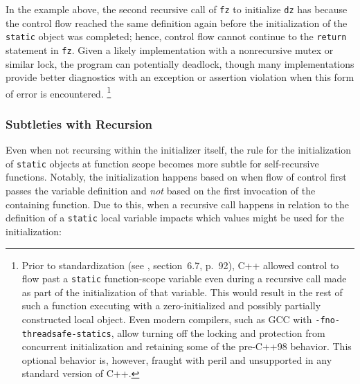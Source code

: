\noindent In the example above, the second recursive call of \lstinline!fz!
to initialize \lstinline!dz! has  because the control flow reached the
same definition again before the initialization of the
\lstinline!static! object was completed; hence, control flow cannot continue to the
\lstinline!return! statement in \lstinline!fz!. Given a likely implementation
with a nonrecursive mutex or similar lock, the program can potentially deadlock,
though many implementations provide better diagnostics with an exception or
assertion violation when this form of error is encountered.
{\cprotect\footnote{Prior to standardization (see \cite{ellis90}, section~6.7, p.~92),
C++ allowed control to flow past a
\lstinline!static! function-scope variable even during a recursive call
made as part of the initialization of that variable. This would result
in the rest of such a function executing with a zero-initialized and
possibly partially constructed local object. Even modern compilers,
such as GCC with \lstinline!-fno-threadsafe-statics!, allow turning off
the locking and protection from concurrent initialization and
retaining some of the pre-C++98 behavior. This optional behavior is,
however, fraught with peril and unsupported in any standard version of
  C++.}}


\subsubsection[Subtleties with Recursion]{Subtleties with Recursion}\label{subtleties-with-recursion}

Even when not recursing within the initializer itself, the rule for the
initialization of \lstinline!static! objects at function
scope becomes more subtle for self-recursive functions.
Notably, the initialization happens based
on when flow of control first passes the variable definition and \emph{not}
based on the first invocation of the containing function.  Due to this, when a recursive call
happens in relation to the definition of a \lstinline!static! local variable
impacts which values might be used for the initialization:

